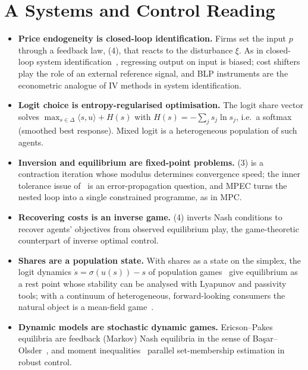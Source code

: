 \documentclass[10pt,a4paper]{article}
\begin{document}
\section{A Systems and Control Reading}
\begin{itemize}
\item \textbf{Price endogeneity is closed-loop identification.} Firms set the
input $p$ through a feedback law, (4), that reacts to the disturbance $\xi$. As
in closed-loop system identification~\cite{Ljung1999}, regressing output on
input is biased; cost shifters play the role of an external reference signal,
and BLP instruments are the econometric analogue of IV methods in system
identification.
\item \textbf{Logit choice is entropy-regularised optimisation.} The logit share
vector solves $\max_{s\in\Delta}\langle s,u\rangle+H(s)$ with $H(s)=-\sum_j
s_j\ln s_j$, i.e.\ a softmax (smoothed best response). Mixed logit is a
heterogeneous population of such agents.
\item \textbf{Inversion and equilibrium are fixed-point problems.} (3) is a
contraction iteration whose modulus determines convergence speed; the inner
tolerance issue of~\cite{DubeFoxSu2012} is an error-propagation question, and
MPEC turns the nested loop into a single constrained programme, as in MPC.
\item \textbf{Recovering costs is an inverse game.} (4) inverts Nash conditions
to recover agents' objectives from observed equilibrium play, the game-theoretic
counterpart of inverse optimal control.
\item \textbf{Shares are a population state.} With shares as a state on the
simplex, the logit dynamics $\dot s=\sigma(u(s))-s$ of population
games~\cite{Sandholm2010} give equilibrium as a rest point whose stability can
be analysed with Lyapunov and passivity tools; with a continuum of
heterogeneous, forward-looking consumers the natural object is a mean-field
game~\cite{HuangMalhameCaines2006}.
\item \textbf{Dynamic models are stochastic dynamic games.} Ericson--Pakes
equilibria are feedback (Markov) Nash equilibria in the sense of
Ba\c{s}ar--Olsder~\cite{BasarOlsder1999}, and moment
inequalities~\cite{PPHI2015} parallel set-membership estimation in robust
control.
\end{itemize}
\end{document}
